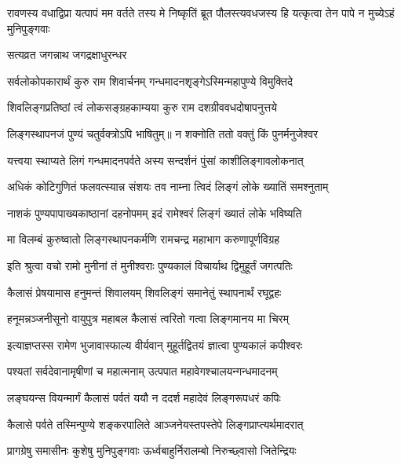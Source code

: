 \threelineshloka
{रावणस्य वधाद्विप्रा यत्पापं मम वर्तते}
{तस्य मे निष्कृतिं ब्रूत पौलस्त्यवधजस्य हि}
{यत्कृत्वा तेन पापे न मुच्येऽहं मुनिपुङ्गवाः}%



\onelineshloka
{सत्यव्रत जगन्नाथ जगद्रक्षाधुरन्धर}%

\twolineshloka
{सर्वलोकोपकारार्थं कुरु राम शिवार्चनम्}
{गन्धमादनशृङ्गेऽस्मिन्महापुण्ये विमुक्तिदे}%

\twolineshloka
{शिवलिङ्गप्रतिष्ठां त्वं लोकसङ्ग्रहकाम्यया}
{कुरु राम दशग्रीववधदोषापनुत्तये}%


\twolineshloka
{लिङ्गस्थापनजं पुण्यं चतुर्वक्त्रोऽपि भाषितुम्॥}
{न शक्नोति ततो वक्तुं किं पुनर्मनुजेश्वर}%

\twolineshloka
{यत्त्वया स्थाप्यते लिगं गन्धमादनपर्वते}
{अस्य सन्दर्शनं पुंसां काशीलिङ्गावलोकनात्}%

\twolineshloka
{अधिकं कोटिगुणितं फलवत्स्यान्न संशयः}
{तव नाम्ना त्विदं लिङ्गं लोके ख्यातिं समश्नुताम्}%

\twolineshloka
{नाशकं पुण्यपापाख्यकाष्ठानां दहनोपमम्}
{इदं रामेश्वरं लिङ्गं ख्यातं लोके भविष्यति}%

\twolineshloka
{मा विलम्बं कुरुष्वातो लिङ्गस्थापनकर्मणि}
{रामचन्द्र महाभाग करुणापूर्णविग्रह}%


\twolineshloka
{इति श्रुत्वा वचो रामो मुनीनां तं मुनीश्वराः}
{पुण्यकालं विचार्याथ द्विमुहूर्तं जगत्पतिः}%

\twolineshloka
{कैलासं प्रेषयामास हनुमन्तं शिवालयम्}
{शिवलिङ्गं समानेतुं स्थापनार्थं रघूद्वहः}%


\twolineshloka
{हनूमन्नञ्जनीसूनो वायुपुत्र महाबल}
{कैलासं त्वरितो गत्वा लिङ्गमानय मा चिरम्}%

\twolineshloka
{इत्याज्ञप्तस्स रामेण भुजावास्फाल्य वीर्यवान्}
{मुहूर्तद्वितयं ज्ञात्वा पुण्यकालं कपीश्वरः}%

\twolineshloka
{पश्यतां सर्वदेवानामृषीणां च महात्मनाम्}
{उत्पपात महावेगश्चालयन्गन्धमादनम्}%

\twolineshloka
{लङ्घयन्स वियन्मार्गं कैलासं पर्वतं ययौ}
{न ददर्श महादेवं लिङ्गरूपधरं कपिः}%

\twolineshloka
{कैलासे पर्वते तस्मिन्पुण्ये शङ्करपालिते}
{आञ्जनेयस्तपस्तेपे लिङ्गप्राप्त्यर्थमादरात्}%

\twolineshloka
{प्रागग्रेषु समासीनः कुशेषु मुनिपुङ्गवाः}
{ऊर्ध्वबाहुर्निरालम्बो निरुच्छ्वासो जितेन्द्रियः}%

